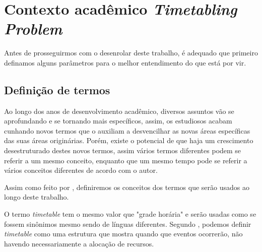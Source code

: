 \chapter{Contexto acadêmico \textit{Timetabling Problem}} %

Antes de prosseguirmos com o desenrolar deste trabalho, é adequado que primeiro definamos alguns parâmetros para o melhor entendimento do que está por vir.


\section{Definição de termos} %

    Ao longo dos anos de desenvolvimento acadêmico, diversos assuntos vão se aprofundando e se tornando mais específicos, assim, os estudiosos acabam cunhando novos termos que o auxiliam a desvencilhar as novas áreas específicas das suas áreas originárias. Porém, existe o potencial de que haja um crescimento desestruturado destes novos termos, assim vários termos diferentes podem se referir a um mesmo conceito, enquanto que um mesmo tempo pode se referir a vários conceitos diferentes de acordo com o autor.

    Assim como feito por \cite{goos_scheduling_1996}, definiremos os conceitos dos termos que serão usados ao longo deste trabalho.

    O termo \textit{timetable} tem o mesmo valor que "grade horária" e serão usadas como se fossem sinônimos mesmo sendo de línguas diferentes. Segundo \cite{goos_scheduling_1996}, podemos definir \textit{timetable} como uma estrutura que mostra quando que eventos ocorrerão, não havendo necessariamente a alocação de recursos.

